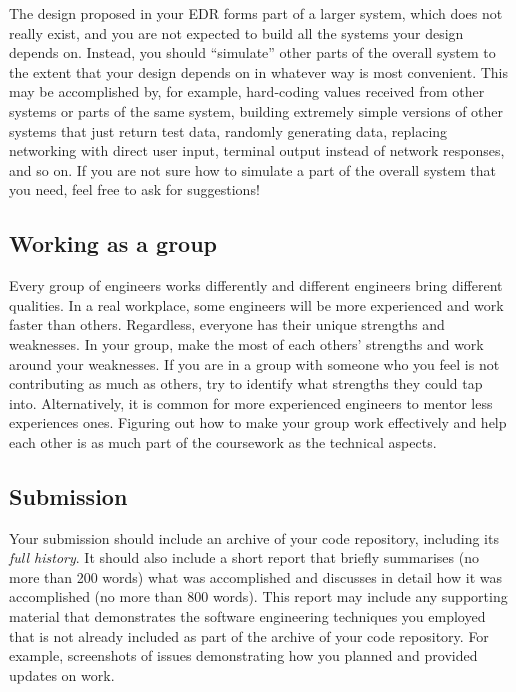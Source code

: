 The design proposed in your EDR forms part of a larger system, which does not really exist, and you are not expected to build all the systems your design depends on. Instead, you should ``simulate'' other parts of the overall system to the extent that your design depends on in whatever way is most convenient. This may be accomplished by, for example, hard-coding values received from other systems or parts of the same system, building extremely simple versions of other systems that just return test data, randomly generating data, replacing networking with direct user input, terminal output instead of network responses, and so on. If you are not sure how to simulate a part of the overall system that you need, feel free to ask for suggestions!

\subsection{Working as a group}

Every group of engineers works differently and different engineers bring different qualities. In a real workplace, some engineers will be more experienced and work faster than others. Regardless, everyone has their unique strengths and weaknesses. In your group, make the most of each others' strengths and work around your weaknesses. If you are in a group with someone who you feel is not contributing as much as others, try to identify what strengths they could tap into. Alternatively, it is common for more experienced engineers to mentor less experiences ones. Figuring out how to make your group work effectively and help each other is as much part of the coursework as the technical aspects.

\subsection{Submission}

Your submission should include an archive of your code repository, including its \emph{full history}. It should also include a short report that briefly summarises (no more than 200 words) what was accomplished and discusses in detail how it was accomplished (no more than 800 words). This report may include any supporting material that demonstrates the software engineering techniques you employed that is not already included as part of the archive of your code repository. For example, screenshots of issues demonstrating how you planned and provided updates on work.

